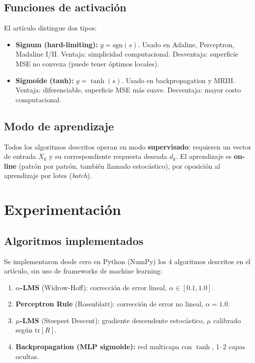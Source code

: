 \documentclass[12pt,a4paper]{article}
\begin{document}
\subsection{Funciones de activación}

El artículo distingue dos tipos:
\begin{itemize}[leftmargin=*]
    \item \textbf{Signum (hard-limiting):} $y = \mathrm{sgn}(s)$. Usado en Adaline, Perceptron, Madaline I/II. Ventaja: simplicidad computacional. Desventaja: superficie MSE no convexa (puede tener óptimos locales).
    \item \textbf{Sigmoide (tanh):} $y = \tanh(s)$. Usado en backpropagation y MRIII. Ventaja: diferenciable, superficie MSE más suave. Desventaja: mayor costo computacional.
\end{itemize}

\subsection{Modo de aprendizaje}

Todos los algoritmos descritos operan en modo \textbf{supervisado}: requieren un vector de entrada $X_k$ y su correspondiente respuesta deseada $d_k$. El aprendizaje es \textbf{on-line} (patrón por patrón, también llamado estocástico), por oposición al aprendizaje por lotes (\textit{batch}).

\section{Experimentación}

\subsection{Algoritmos implementados}

Se implementaron desde cero en Python (NumPy) los 4 algoritmos descritos en el artículo, sin uso de frameworks de machine learning:

\begin{enumerate}[leftmargin=*]
    \item $\alpha$\textbf{-LMS} (Widrow-Hoff): corrección de error lineal, $\alpha \in [0.1, 1.0]$.
    \item \textbf{Perceptron Rule} (Rosenblatt): corrección de error no lineal, $\alpha = 1.0$.
    \item $\mu$\textbf{-LMS} (Steepest Descent): gradiente descendente estocástico, $\mu$ calibrado según $\mathrm{tr}[R]$.
    \item \textbf{Backpropagation (MLP sigmoide):} red multicapa con $\tanh$, 1--2 capas ocultas.
\end{enumerate}
\end{document}
